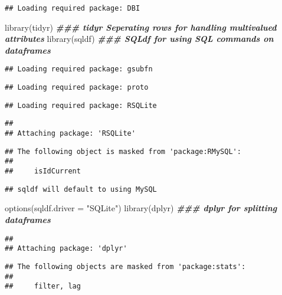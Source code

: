 \documentclass[
]{article}
\newenvironment{Shaded}{\begin{snugshade}}{\end{snugshade}}
\newcommand{\AttributeTok}[1]{\textcolor[rgb]{0.77,0.63,0.00}{#1}}
\newcommand{\DocumentationTok}[1]{\textcolor[rgb]{0.56,0.35,0.01}{\textbf{\textit{#1}}}}
\newcommand{\FunctionTok}[1]{\textcolor[rgb]{0.00,0.00,0.00}{#1}}
\newcommand{\NormalTok}[1]{#1}
\newcommand{\StringTok}[1]{\textcolor[rgb]{0.31,0.60,0.02}{#1}}
\begin{document}
\begin{verbatim}
## Loading required package: DBI
\end{verbatim}

\begin{Shaded}
\begin{Highlighting}[]
\FunctionTok{library}\NormalTok{(tidyr)      }\DocumentationTok{\#\#\# tidyr Seperating rows for handling multivalued attributes}
\FunctionTok{library}\NormalTok{(sqldf)      }\DocumentationTok{\#\#\# SQLdf for using SQL commands on dataframes}
\end{Highlighting}
\end{Shaded}

\begin{verbatim}
## Loading required package: gsubfn
\end{verbatim}

\begin{verbatim}
## Loading required package: proto
\end{verbatim}

\begin{verbatim}
## Loading required package: RSQLite
\end{verbatim}

\begin{verbatim}
## 
## Attaching package: 'RSQLite'
\end{verbatim}

\begin{verbatim}
## The following object is masked from 'package:RMySQL':
## 
##     isIdCurrent
\end{verbatim}

\begin{verbatim}
## sqldf will default to using MySQL
\end{verbatim}

\begin{Shaded}
\begin{Highlighting}[]
\FunctionTok{options}\NormalTok{(}\AttributeTok{sqldf.driver =} \StringTok{"SQLite"}\NormalTok{)}
\FunctionTok{library}\NormalTok{(dplyr)      }\DocumentationTok{\#\#\# dplyr for splitting dataframes}
\end{Highlighting}
\end{Shaded}

\begin{verbatim}
## 
## Attaching package: 'dplyr'
\end{verbatim}

\begin{verbatim}
## The following objects are masked from 'package:stats':
## 
##     filter, lag
\end{verbatim}
\end{document}
